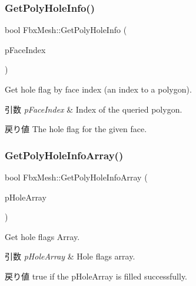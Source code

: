 \subsubsection{\texorpdfstring{Get\+Poly\+Hole\+Info()}{GetPolyHoleInfo()}}
{\footnotesize\ttfamily bool Fbx\+Mesh\+::\+Get\+Poly\+Hole\+Info (\begin{DoxyParamCaption}\item[{int}]{p\+Face\+Index }\end{DoxyParamCaption})}

Get hole flag by face index (an index to a polygon). 
\begin{DoxyParams}{引数}
{\em p\+Face\+Index} & Index of the queried polygon. \\
\hline
\end{DoxyParams}
\begin{DoxyReturn}{戻り値}
The hole flag for the given face. 
\end{DoxyReturn}
\mbox{\label{class_fbx_mesh_a8b512771bbaf8243e24e649d253003a3}} 
\subsubsection{\texorpdfstring{Get\+Poly\+Hole\+Info\+Array()}{GetPolyHoleInfoArray()}}
{\footnotesize\ttfamily bool Fbx\+Mesh\+::\+Get\+Poly\+Hole\+Info\+Array (\begin{DoxyParamCaption}\item[{\hyperlink{class_fbx_layer_element_array_template}{Fbx\+Layer\+Element\+Array\+Template}$<$ bool $>$ $\ast$$\ast$}]{p\+Hole\+Array }\end{DoxyParamCaption})}

Get hole flags Array. 
\begin{DoxyParams}{引数}
{\em p\+Hole\+Array} & Hole flags array. \\
\hline
\end{DoxyParams}
\begin{DoxyReturn}{戻り値}
{\ttfamily true} if the p\+Hole\+Array is filled successfully. 
\end{DoxyReturn}
\mbox{\label{class_fbx_mesh_aa2ee9371868bd2cf625f96e31ef44577}} 
